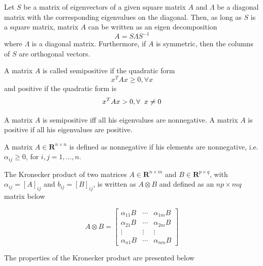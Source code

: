     \begin{theorem}\label{thr:2.1}
        \cite{strang2006linear}  Let $S$ be a matrix of eigenvectors of a given square matrix $A$ and $\Lambda$ be a diagonal matrix with the corresponding eigenvalues on the diagonal. Then, as long as $S$ is a square matrix, matrix $A$ can be written as an eigen decomposition
        \begin{equation}\label{eq:2.2.3}
            A = S\Lambda S^{-1}
        \end{equation}
        where $\Lambda$ is a diagonal matrix. Furthermore, if $A$ is symmetric, then the columns of $S$ are orthogonal vectors. 
    \end{theorem}
    
    \begin{definition}\label{def:2.14}
        \cite{strang2006linear} A matrix $A$ is called semipositive if the quadratic form
        \begin{equation*}
            x^TAx \geq 0, \forall x
        \end{equation*}
        and positive if the quadratic form is
        \begin{equation*}
            x^TAx > 0, \forall \hspace{2.0mm} x  \neq 0
        \end{equation*}
    \end{definition}
    
    \begin{corollary}\label{cor:2.1}
        \cite{strang2006linear} A matrix $A$ is semipositive iff all his eigenvalues are nonnegative. A matrix $A$ is positive if all his eigenvalues are positive.
    \end{corollary}
    
    \begin{definition}\label{def:2.15}
        \cite{strang2006linear} A matrix $ A \in \mathbf{R}^{n\times n}$ is defined as nonnegative if his elements are nonnegative, i.e. $\alpha_{ij} \geq 0$, for $i,j = 1,...,n$.
    \end{definition}
    
    \begin{definition}\label{def:2.16}
        \cite{strang2006linear} The Kronecker product of two matrices $A \in \mathbf{R}^{n\times m}$ and $B \in \mathbf{R}^{p \times q}$, with $\alpha_{ij} = [A]_{ij}$ and $b_{ij} = [B]_{ij}$, is written as $A \otimes B$ and defined as an $np \times mq$ matrix below
    
        \begin{equation} \label{eq:2.2.4}
            A \otimes B = \left[\begin{matrix}
                 \alpha_{11}B & \cdots & \alpha_{1m}B \\
                    \alpha_{21}B & \cdots & \alpha_{2m}B \\
                    \vdots & \vdots & \vdots \\
                    \alpha_{n1}B & \cdots & \alpha_{nm}B
            \end{matrix} \right]
        \end{equation}
    \end{definition}
    The properties of the Kronecker product are presented below
    
